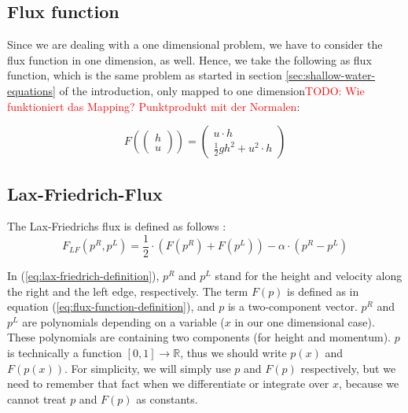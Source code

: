 \documentclass{article}
\newcommand{\todo}[2][]{\textcolor{red}{TODO\ifthenelse{\equal{#1}{}}{}{[#1]}: #2}}
\newcommand{\reals}{\mathbb{R}}
\begin{document}
\subsection{Flux function}
\label{sec:flux-function-intro}

Since we are dealing with a one dimensional problem, we have to consider the flux function in one dimension, as well. Hence, we take the following as flux function, which is the same problem as started in section \ref{sec:shallow-water-equations} of the introduction, only mapped to one dimension\todo{Wie funktioniert das Mapping? Punktprodukt mit der Normalen}:

\begin{equation}
  \label{eq:flux-function-definition}
  F\left(
    \begin{pmatrix}
      h \\ u
    \end{pmatrix}
  \right) =
  \begin{pmatrix}
    u \cdot h \\
    \frac{1}{2} g h^2 + u^2 \cdot h
  \end{pmatrix}
\end{equation}

\subsection{Lax-Friedrich-Flux}
\label{sec:lax-friedrich-definition}

The Lax-Friedrichs flux is defined as follows \cite{leveque2002finite}:
\begin{equation}
  \label{eq:lax-friedrich-definition}
  F_{LF}(p^R,p^L) = \dfrac{1}{2}\cdot (F(p^R) + F(p^L)) - \alpha \cdot (p^R - p^L)
\end{equation}

In (\ref{eq:lax-friedrich-definition}), $p^R$ and $p^L$ stand for the height and velocity along the right and the left edge, respectively. The term $F(p)$ is defined as in equation (\ref{eq:flux-function-definition}), and $p$ is a two-component vector. $p^R$ and $p^L$ are polynomials depending on a variable ($x$ in our one dimensional case). These polynomials are containing two components (for height and momentum). $p$ is technically a function $[0,1]\rightarrow\reals$, thus we should write $p\left(x\right)$ and $F\left(p\left(x\right)\right)$. For simplicity, we will simply use $p$ and $F\left(p\right)$ respectively, but we need to remember that fact when we differentiate or integrate over $x$, because we cannot treat $p$ and $F\left(p\right)$ as constants.
\end{document}

